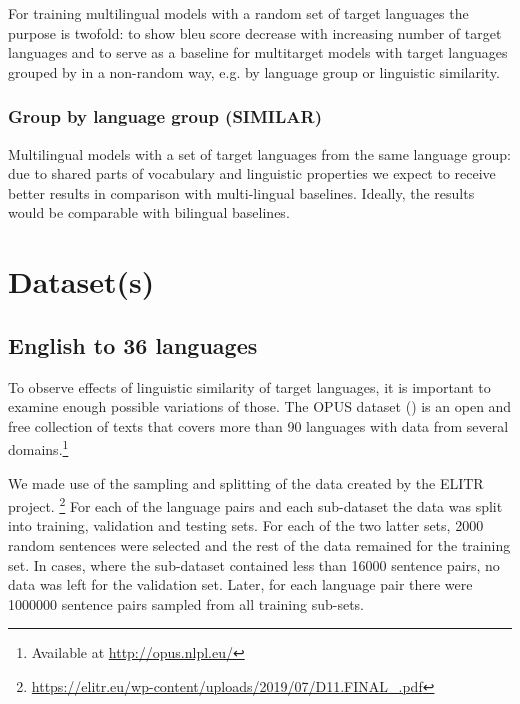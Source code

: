 For training multilingual models with a random set of target languages
the purpose is twofold: 
to show \acrshort{bleu} score decrease with increasing number of target languages and
to serve as a baseline for multitarget models with target languages grouped by
in a non-random way, e.g. by language group or linguistic similarity.


\subsubsection*{Group by language group (SIMILAR)}

Multilingual models with a set of target languages from the same language group:
due to shared parts of vocabulary and linguistic properties we expect to
receive better results in comparison with multi-lingual baselines.
Ideally, the results would be comparable with bilingual baselines.


% 


\section{Dataset(s)}
\label{section:datasets}


\subsection{{English to 36 languages}}
\label{subsection:en-to-36}

To observe effects of linguistic similarity of target languages,
it is important to examine enough possible variations of those.
The OPUS dataset (\cite{TIEDEMANN12.463}) is an open and free collection of texts
that covers more than 90 languages with data from several
domains.\footnote{Available at \url{http://opus.nlpl.eu/}} 

We made use of the sampling and splitting of the data created by the ELITR project.%
\footnote{\url{https://elitr.eu/wp-content/uploads/2019/07/D11.FINAL\_.pdf}}
For each of the language pairs and each sub-dataset
the data was split into training, validation and testing sets.
For each of the two latter sets, 2000 random sentences were selected
and the rest of the data remained for the training set.
In cases, where the sub-dataset contained less than 16000 sentence pairs,
no data was left for the validation set.
Later, for each language pair there were 1000000 sentence pairs
sampled from all training sub-sets.

